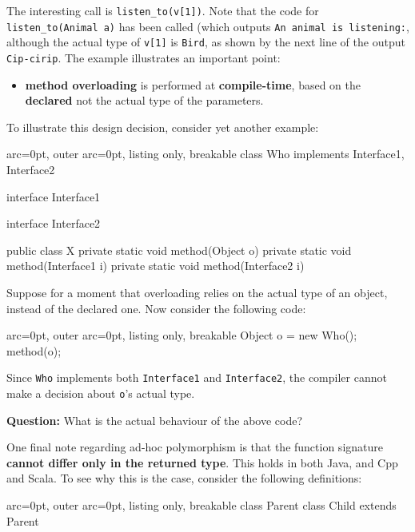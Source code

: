 The interesting call is \texttt{listen\_to(v[1])}. Note that the code for \texttt{listen\_to(Animal a)} has been called (which outputs \texttt{An animal is listening:}, although the actual type of \texttt{v[1]} is \texttt{Bird}, as shown by the next line of the output \texttt{Cip-cirip}. The example illustrates an important point:

\begin{itemize}
	\item  \textbf{method overloading} is performed at \textbf{compile-time}, based on the \textbf{declared} not the actual type of the parameters.
\end{itemize}

To illustrate this design decision, consider yet another example:


\begin{tcblisting}{ arc=0pt, outer arc=0pt, listing only, breakable}
class Who implements Interface1, Interface2 {}

interface Interface1 {}

interface Interface2 {}

public class X {
    private static void method(Object o)     {}
    private static void method(Interface1 i) {}
    private static void method(Interface2 i) {}
}

\end{tcblisting}


Suppose for a moment that overloading relies on the actual type of an object, instead of the declared one. Now consider the following code:

\begin{tcblisting}{ arc=0pt, outer arc=0pt, listing only, breakable}
   Object o = new Who();
   method(o);

\end{tcblisting}


Since \texttt{Who} implements both \texttt{Interface1} and \texttt{Interface2}, the compiler cannot make a decision about \texttt{o}'s actual type.

\textbf{Question:} What is the actual behaviour of the above code?

One final note regarding ad-hoc polymorphism is that the function signature \textbf{cannot differ only in the returned type}. This holds in both Java, and Cpp and Scala. To see why this is the case, consider the following definitions:


\begin{tcblisting}{ arc=0pt, outer arc=0pt, listing only, breakable}
class Parent {}
class Child extends Parent {}

\end{tcblisting}


